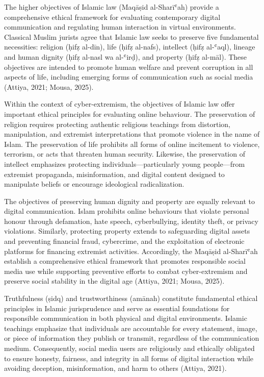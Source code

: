 \documentclass[10pt]{NSP1}
\begin{document}
The higher objectives of Islamic law (Maqāṣid al-Sharīʿah) provide a comprehensive ethical framework for evaluating contemporary digital communication and regulating human interaction in virtual environments. Classical Muslim jurists agree that Islamic law seeks to preserve five fundamental necessities: religion (ḥifẓ al-dīn), life (ḥifẓ al-nafs), intellect (ḥifẓ al-ʿaql), lineage and human dignity (ḥifẓ al-nasl wa al-ʿirḍ), and property (ḥifẓ al-māl). These objectives are intended to promote human welfare and prevent corruption in all aspects of life, including emerging forms of communication such as social media (Attiya, 2021; Mousa, 2025).

Within the context of cyber-extremism, the objectives of Islamic law offer important ethical principles for evaluating online behaviour. The preservation of religion requires protecting authentic religious teachings from distortion, manipulation, and extremist interpretations that promote violence in the name of Islam. The preservation of life prohibits all forms of online incitement to violence, terrorism, or acts that threaten human security. Likewise, the preservation of intellect emphasizes protecting individuals—particularly young people—from extremist propaganda, misinformation, and digital content designed to manipulate beliefs or encourage ideological radicalization.

The objectives of preserving human dignity and property are equally relevant to digital communication. Islam prohibits online behaviours that violate personal honour through defamation, hate speech, cyberbullying, identity theft, or privacy violations. Similarly, protecting property extends to safeguarding digital assets and preventing financial fraud, cybercrime, and the exploitation of electronic platforms for financing extremist activities. Accordingly, the Maqāṣid al-Sharīʿah establish a comprehensive ethical framework that promotes responsible social media use while supporting preventive efforts to combat cyber-extremism and preserve social stability in the digital age (Attiya, 2021; Mousa, 2025).

\par\medskip{}\smallskip

Truthfulness (ṣidq) and trustworthiness (amānah) constitute fundamental ethical principles in Islamic jurisprudence and serve as essential foundations for responsible communication in both physical and digital environments. Islamic teachings emphasize that individuals are accountable for every statement, image, or piece of information they publish or transmit, regardless of the communication medium. Consequently, social media users are religiously and ethically obligated to ensure honesty, fairness, and integrity in all forms of digital interaction while avoiding deception, misinformation, and harm to others (Attiya, 2021).
\end{document}
